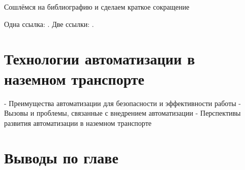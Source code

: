 Сошлёмся на библиографию и сделаем краткое сокращение 

Одна ссылка: \cite[с.~39]{Evtukov}.
Две ссылки: \cite{doi:10.36652/1684-1298-2023-36-39,Baumana}.

\section{Технологии автоматизации в наземном транспорте}\label{sec:ch1/sec3}

- Преимущества автоматизации для безопасности и эффективности работы
- Вызовы и проблемы, связанные с внедрением автоматизации
- Перспективы развития автоматизации в наземном транспорте

\section{Выводы по главе}\label{sec:ch1/sec4}

\FloatBarrier
